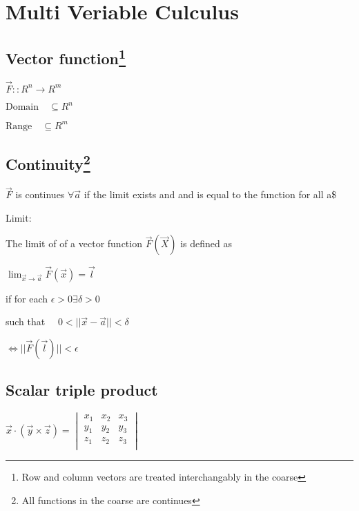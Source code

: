\documentclass{tufte-book}
\begin{document}
\hypertarget{multi-veriable-culculus}{%
\section{Multi Veriable Culculus}\label{multi-veriable-culculus}}

\hypertarget{vector-function}{%
\subsection[Vector function]{\texorpdfstring{Vector function\footnote{Row
  and column vectors are treated interchangably in the coarse}}{Vector function}}\label{vector-function}}

\(\vec{F} :: R^n \rightarrow R^m\)

\(\text{Domain} \quad \subseteq R^n\)

\(\text{Range} \quad \subseteq R^m\)

\hypertarget{continuity}{%
\subsection[Continuity]{\texorpdfstring{Continuity\footnote{All
  functions in the coarse are continues}}{Continuity}}\label{continuity}}

\(\vec{F}\) is continues \(\forall \vec{a}\) if the limit exists and and
is equal to the function for all a\$

Limit:

The limit of of a vector function \(\vec{F}(\vec{X})\) is defined as

\(\lim_{ \vec{x} \to \vec{a} } \vec{F} (\vec{x} ) = \vec{l}\)

if for each \(\epsilon > 0 \exists \delta > 0\)

such that \(\quad 0< ||\vec{x}-\vec{a}|| < \delta\)

\(\Leftrightarrow || \vec{F} (\vec{l})|| < \epsilon\)

\hypertarget{scalar-triple-product}{%
\subsection{Scalar triple product}\label{scalar-triple-product}}

\(\vec{x} \cdot (\vec{y} \times \vec{z}) =  \begin{vmatrix}  x_1 & x_2 & x_3 \\  y_1 & y_2 & y_3 \\  z_1 & z_2 & z_3 \\  \end{vmatrix}\)
\end{document}

